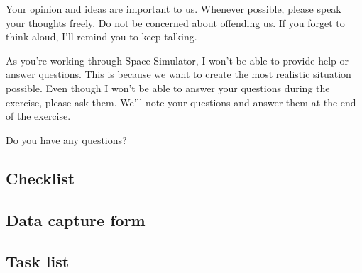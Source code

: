 Your opinion and ideas are important to us.  Whenever possible, please speak your thoughts freely.  Do not be concerned about offending us.  If you forget to think aloud, I'll remind you to keep talking. 
    
As you’re working through Space Simulator, I won’t be able to provide help or answer questions.  This is because we want to create the most realistic situation possible.  Even though I won't be able to answer your questions during the exercise, please ask them. We'll note your questions and answer them at the end of the exercise. 
     
Do you have any questions? 

\subsection{Checklist}

\subsection{Data capture form}

\subsection{Task list}

